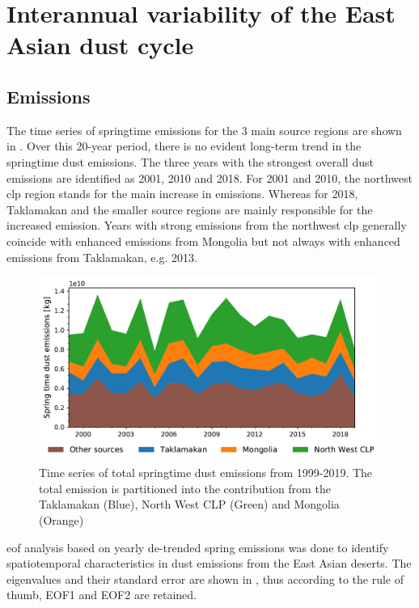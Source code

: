 \section{Interannual variability of the East Asian dust cycle}\label{sec:inter_annual_results}

\subsection{Emissions}
The time series of springtime emissions for the 3 main source regions are shown in . Over this 20-year period, there is no evident long-term trend in the springtime dust emissions. 
The three years with the strongest overall dust emissions are identified as 2001, 2010 and 2018. For 2001 and 2010, the northwest \acrshort{clp} region stands for the main increase in emissions.
Whereas for 2018, Taklamakan and the smaller source regions are mainly responsible for the increased emission.
Years with strong emissions from the northwest \acrshort{clp} generally coincide with enhanced emissions from Mongolia but not always with enhanced emissions from Taklamakan, e.g. 2013.   

\begin{figure}[htbp]
    \centering
    \includegraphics[width=\textwidth]{texfiles/figs/emission_timeseries_1999_2019.pdf}
    \caption{Time series of total springtime dust emissions from 1999-2019. The total emission is partitioned into the contribution from the Taklamakan (Blue), North West CLP (Green) and Mongolia (Orange) }
    \label{fig:emission_timeseries}
\end{figure}

\acrfull{eof} analysis based on yearly de-trended spring emissions was done to identify spatiotemporal characteristics in dust emissions from the East Asian deserts. The eigenvalues and their standard error are shown in , thus according to the \textcite{north1982sampling} rule of thumb, EOF1 and EOF2 are retained. 
 


